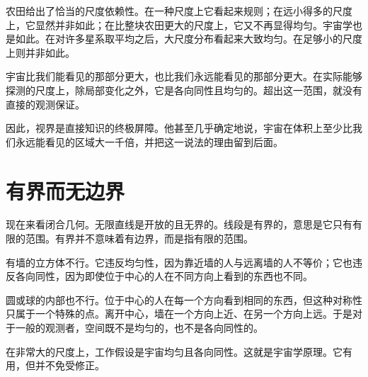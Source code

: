 农田给出了恰当的尺度依赖性。在一种尺度上它看起来规则；在远小得多的尺度上，它显然并非如此；在比整块农田更大的尺度上，它又不再显得均匀。宇宙学也是如此。在对许多星系取平均之后，大尺度分布看起来大致均匀。在足够小的尺度上则并非如此。

宇宙比我们能看见的那部分更大，也比我们永远能看见的那部分更大。在实际能够探测的尺度上，除局部变化之外，它是各向同性且均匀的。超出这一范围，就没有直接的观测保证。

\begin{classroomqa}
\end{classroomqa}

\begin{classroomqa}
\end{classroomqa}

因此，视界是直接知识的终极屏障。他甚至几乎确定地说，宇宙在体积上至少比我们永远能看见的区域大一千倍，并把这一说法的理由留到后面。

\section{有界而无边界}

现在来看闭合几何。无限直线是开放的且无界的。线段是有界的，意思是它只有有限的范围。有界并不意味着有边界，而是指有限的范围。

有墙的立方体不行。它违反均匀性，因为靠近墙的人与远离墙的人不等价；它也违反各向同性，因为即使位于中心的人在不同方向上看到的东西也不同。

圆或球的内部也不行。位于中心的人在每一个方向看到相同的东西，但这种对称性只属于一个特殊的点。离开中心，墙在一个方向上近、在另一个方向上远。于是对于一般的观测者，空间既不是均匀的，也不是各向同性的。

在非常大的尺度上，工作假设是宇宙均匀且各向同性。这就是宇宙学原理。它有用，但并不免受修正。

\begin{classroomqa}
\end{classroomqa}

